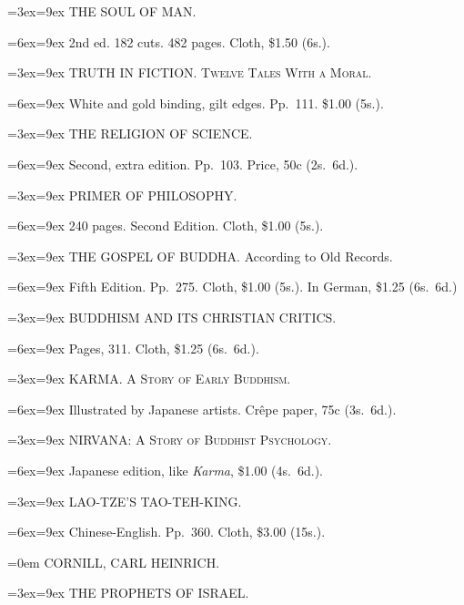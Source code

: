 \documentclass[oneside]{book}
\begin{document}
{\parindent=3ex\hangindent=9ex \small
THE SOUL OF MAN.
\nopagebreak

\parindent=6ex\hangindent=9ex\footnotesize
2nd ed. 182 cuts. 482 pages. Cloth, \$1.50 (6s.).
\smallskip

\parindent=3ex\hangindent=9ex \small
TRUTH IN FICTION\@. \textsc{Twelve Tales With a Moral.}
\nopagebreak

\parindent=6ex\hangindent=9ex\footnotesize
White and gold binding, gilt edges. Pp.~111. \$1.00 (5s.).
\smallskip

\parindent=3ex\hangindent=9ex \small
THE RELIGION OF SCIENCE.
\nopagebreak

\parindent=6ex\hangindent=9ex\footnotesize
Second, extra edition. Pp.~103. Price, 50c (2s.~6d.).
\smallskip

\parindent=3ex\hangindent=9ex \small
PRIMER OF PHILOSOPHY.
\nopagebreak

\parindent=6ex\hangindent=9ex\footnotesize
240 pages. Second Edition. Cloth, \$1.00 (5s.).
\smallskip

\parindent=3ex\hangindent=9ex \small
THE GOSPEL OF BUDDHA\@. According to Old Records.
\nopagebreak

\parindent=6ex\hangindent=9ex\footnotesize
Fifth Edition. Pp.~275. Cloth, \$1.00 (5s.). In German, \$1.25 (6s.~6d.)
\smallskip

\parindent=3ex\hangindent=9ex \small
BUDDHISM AND ITS CHRISTIAN CRITICS.
\nopagebreak

\parindent=6ex\hangindent=9ex\footnotesize
Pages, 311. Cloth, \$1.25 (6s.~6d.).
\smallskip

\parindent=3ex\hangindent=9ex \small
KARMA\@. \textsc{A Story of Early Buddhism.}
\nopagebreak

\parindent=6ex\hangindent=9ex\footnotesize
Illustrated by Japanese artists. Crêpe paper, 75c (3s.~6d.).
\smallskip

\parindent=3ex\hangindent=9ex \small
NIRVANA: \textsc{A Story of Buddhist Psychology.}
\nopagebreak

\parindent=6ex\hangindent=9ex\footnotesize
Japanese edition, like \textit{Karma}, \$1.00 (4s.~6d.).
\smallskip

\parindent=3ex\hangindent=9ex \small
LAO-TZE'S TAO-TEH-KING.
\nopagebreak

\parindent=6ex\hangindent=9ex\footnotesize
Chinese-English. Pp.~360. Cloth, \$3.00 (15s.).
\medskip

\parindent=0em \normalsize
CORNILL, CARL HEINRICH.
\nopagebreak

\parindent=3ex\hangindent=9ex \small
THE PROPHETS OF ISRAEL.
\nopagebreak

}
\end{document}
